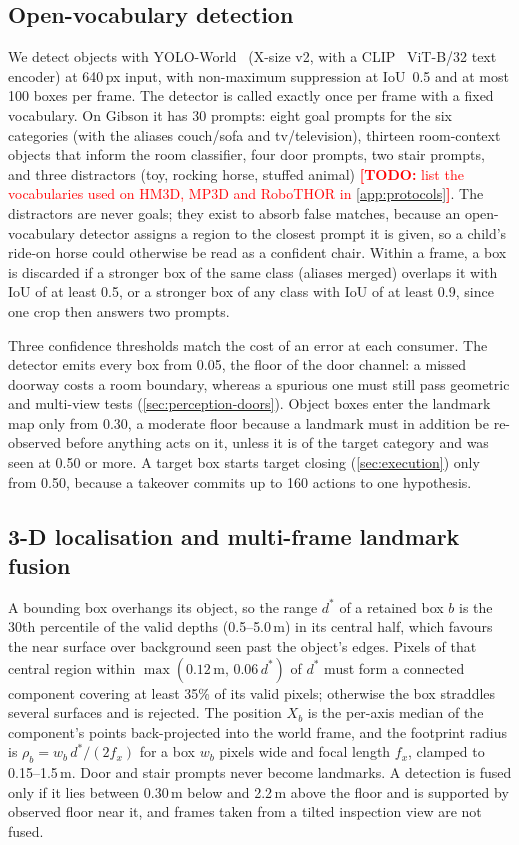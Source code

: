 \documentclass[10pt]{article}
\newcommand{\TODO}[1]{\textcolor{red}{\textbf{[TODO:} #1\textbf{]}}}
\begin{document}
\subsection{Open-vocabulary detection}\label{sec:perception-detection}

We detect objects with YOLO-World~\citep{cheng2024yolo} (X-size v2, with a CLIP~\citep{radford2021learning} ViT-B/32
text encoder) at 640\,px input, with non-maximum suppression at IoU~0.5 and at most 100 boxes per frame. The detector
is called exactly once per frame with a fixed vocabulary. On Gibson it has 30 prompts: eight goal prompts for the six
categories (with the aliases couch/sofa and tv/television), thirteen room-context objects that inform the room
classifier, four door prompts, two stair prompts, and three distractors (toy, rocking horse, stuffed animal)
\TODO{list the vocabularies used on HM3D, MP3D and RoboTHOR in \cref{app:protocols}}. The distractors are never goals;
they exist to absorb false matches, because an open-vocabulary detector assigns a region to the closest prompt it is
given, so a child's ride-on horse could otherwise be read as a confident chair. Within a frame, a box is discarded if
a stronger box of the same class (aliases merged) overlaps it with IoU of at least 0.5, or a stronger box of any class
with IoU of at least 0.9, since one crop then answers two prompts.

Three confidence thresholds match the cost of an error at each consumer. The detector emits every box from 0.05, the
floor of the door channel: a missed doorway costs a room boundary, whereas a spurious one must still pass geometric and
multi-view tests (\cref{sec:perception-doors}). Object boxes enter the landmark map only from 0.30, a moderate floor
because a landmark must in addition be re-observed before anything acts on it, unless it is of the target category and
was seen at 0.50 or more. A target box starts target closing
(\cref{sec:execution}) only from 0.50, because a takeover commits up to 160 actions to one hypothesis.

\subsection{3-D localisation and multi-frame landmark fusion}\label{sec:perception-fusion}

A bounding box overhangs its object, so the range $d^{*}$ of a retained box $b$ is the 30th percentile of the valid
depths (0.5--5.0\,m) in its central half, which favours the near surface over background seen past the object's edges.
Pixels of that central region within $\max(0.12\,\mathrm{m},\, 0.06\,d^{*})$ of $d^{*}$ must form a connected component
covering at least 35\% of its valid pixels; otherwise the box straddles several surfaces and is rejected. The position
$X_b$ is the per-axis median of the component's points back-projected into the world frame, and the footprint radius is
$\rho_b = w_b\, d^{*} / (2 f_x)$ for a box $w_b$ pixels wide and focal length $f_x$, clamped to 0.15--1.5\,m. Door and
stair prompts never become landmarks. A detection is fused only if it lies between 0.30\,m below and 2.2\,m above the
floor and is supported by observed floor near it, and frames taken from a tilted inspection view are not fused.
\end{document}
